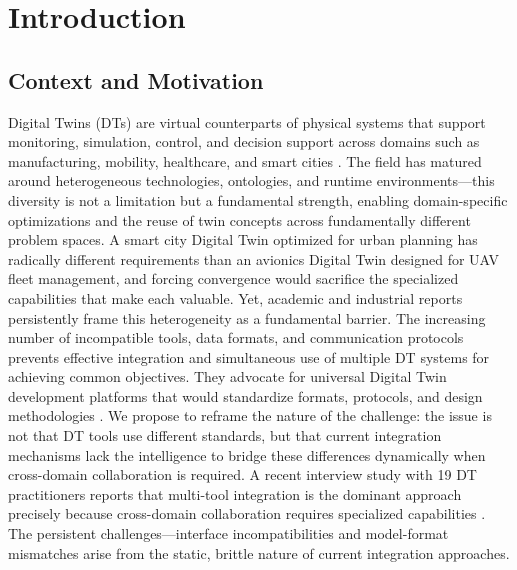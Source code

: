 
\chapter{Introduction}

\section{Context and Motivation}


Digital Twins (DTs) are virtual counterparts of physical systems that support monitoring, simulation, control, and decision support across domains such as manufacturing, mobility, healthcare, and smart cities \cite{Zhang_Wang_Cai_Wang_Guo_Zheng_2022}. The field has matured around heterogeneous technologies, ontologies, and runtime environments—this diversity is not a limitation but a fundamental strength, enabling domain-specific optimizations and the reuse of twin concepts across fundamentally different problem spaces. A smart city Digital Twin optimized for urban planning has radically different requirements than an avionics Digital Twin designed for UAV fleet management, and forcing convergence would sacrifice the specialized capabilities that make each valuable.
Yet, academic and industrial reports persistently frame this heterogeneity as a fundamental barrier. The increasing number of incompatible tools, data formats, and communication protocols prevents effective integration and simultaneous use of multiple DT systems for achieving common objectives. They advocate for universal Digital Twin development platforms that would standardize formats, protocols, and design methodologies \cite{Hu_Zhang_Deng_Liu_Tan_2021,Qi_Tao_Hu_Anwer_Liu_Wei_Wang_Nee_2021}. We propose to reframe the nature of the challenge: the issue is not that DT tools use different standards, but that current integration mechanisms lack the intelligence to bridge these differences dynamically when cross-domain collaboration is required. A recent interview study with 19 DT practitioners reports that multi-tool integration is the dominant approach precisely because cross-domain collaboration requires specialized capabilities \cite{Muctadir_2024}. The persistent challenges—interface incompatibilities and model-format mismatches arise from the static, brittle nature of current integration approaches.

